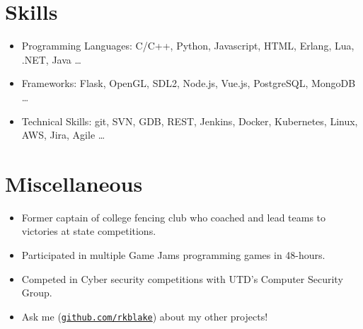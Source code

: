 \documentclass[line,margin]{res}
\begin{document}
\begin{resume}
\vspace{-4pt}
\section{Skills}
\vspace{22pt}
	\begin{itemize} \itemsep -2pt
		\item Programming Languages: C/C++, Python, Javascript, HTML, Erlang, Lua, .NET, Java \ldots
		\item Frameworks: Flask, OpenGL, SDL2, Node.js, Vue.js, PostgreSQL, MongoDB \ldots
		\item Technical Skills: git, SVN, GDB, REST, Jenkins, Docker, Kubernetes, Linux, AWS, Jira, Agile \ldots
	\end{itemize}

\vspace{-4pt}
\section{Miscellaneous}
\vspace{22pt}
	\begin{itemize} \itemsep -2pt
	\item Former captain of college fencing club who coached and lead teams to victories at state competitions.
	\item Participated in multiple Game Jams programming games in 48-hours.
	\item Competed in Cyber security competitions with UTD's Computer Security Group.
	\item Ask me (\href{https://github.com/rkblake}{\texttt{github.com/rkblake}}) about my other projects!
	\end{itemize}

\end{resume}
\end{document}
